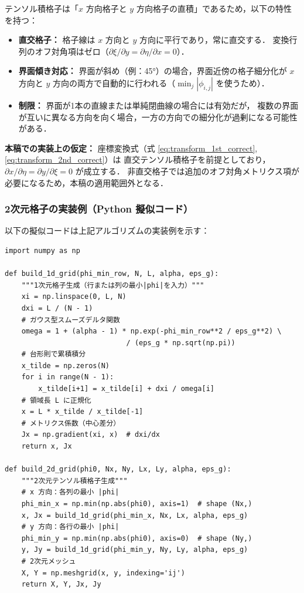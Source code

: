 \begin{tcolorbox}[defbox, title={テンソル積格子の仮定と制限}]
テンソル積格子は「$x$ 方向格子と $y$ 方向格子の直積」であるため，以下の特性を持つ：
\begin{itemize}
  \item \textbf{直交格子：} 格子線は $x$ 方向と $y$ 方向に平行であり，常に直交する．
        変換行列のオフ対角項はゼロ（$\partial\xi/\partial y = \partial\eta/\partial x = 0$）．
  \item \textbf{界面傾き対応：} 界面が斜め（例：45°）の場合，界面近傍の格子細分化が
        $x$ 方向と $y$ 方向の両方で自動的に行われる（$\min_j|\phi_{i,j}|$ を使うため）．
  \item \textbf{制限：} 界面が1本の直線または単純閉曲線の場合には有効だが，
        複数の界面が互いに異なる方向を向く場合，一方の方向での細分化が過剰になる可能性がある．
\end{itemize}

\textbf{本稿での実装上の仮定：} 座標変換式（式 \eqref{eq:transform_1st_correct}, \eqref{eq:transform_2nd_correct}）は
直交テンソル積格子を前提としており，$\partial x/\partial\eta = \partial y/\partial\xi = 0$ が成立する．
非直交格子では追加のオフ対角メトリクス項が必要になるため，本稿の適用範囲外となる．
\end{tcolorbox}

\subsubsection{2次元格子の実装例（Python 擬似コード）}

以下の擬似コードは上記アルゴリズムの実装例を示す：

\begin{tcolorbox}[mybox, title={2次元格子生成の Python 擬似コード}]
\begin{verbatim}
import numpy as np

def build_1d_grid(phi_min_row, N, L, alpha, eps_g):
    """1次元格子生成（行または列の最小|phi|を入力）"""
    xi = np.linspace(0, L, N)
    dxi = L / (N - 1)
    # ガウス型スムーズデルタ関数
    omega = 1 + (alpha - 1) * np.exp(-phi_min_row**2 / eps_g**2) \
                             / (eps_g * np.sqrt(np.pi))
    # 台形則で累積積分
    x_tilde = np.zeros(N)
    for i in range(N - 1):
        x_tilde[i+1] = x_tilde[i] + dxi / omega[i]
    # 領域長 L に正規化
    x = L * x_tilde / x_tilde[-1]
    # メトリクス係数（中心差分）
    Jx = np.gradient(xi, x)  # dxi/dx
    return x, Jx

def build_2d_grid(phi0, Nx, Ny, Lx, Ly, alpha, eps_g):
    """2次元テンソル積格子生成"""
    # x 方向：各列の最小 |phi|
    phi_min_x = np.min(np.abs(phi0), axis=1)  # shape (Nx,)
    x, Jx = build_1d_grid(phi_min_x, Nx, Lx, alpha, eps_g)
    # y 方向：各行の最小 |phi|
    phi_min_y = np.min(np.abs(phi0), axis=0)  # shape (Ny,)
    y, Jy = build_1d_grid(phi_min_y, Ny, Ly, alpha, eps_g)
    # 2次元メッシュ
    X, Y = np.meshgrid(x, y, indexing='ij')
    return X, Y, Jx, Jy
\end{verbatim}
\end{tcolorbox}

